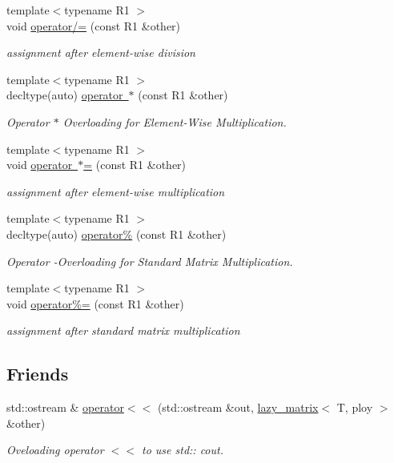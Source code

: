 \begin{DoxyCompactItemize}
{\footnotesize template$<$typename R1 $>$ }\\void \mbox{\hyperlink{classlazy__matrix_acffaec4e4abdb5984ac65aa0b8675e03}{operator/=}} (const R1 \&other)
\begin{DoxyCompactList}\small\item\em assignment after element-\/wise division \end{DoxyCompactList}\item 
{\footnotesize template$<$typename R1 $>$ }\\decltype(auto) \mbox{\hyperlink{classlazy__matrix_a11954c3e2e8af89ccd5f7ae15e12f40b}{operator $\ast$}} (const R1 \&other)
\begin{DoxyCompactList}\small\item\em Operator $\ast$ Overloading for Element-\/\+Wise Multiplication. \end{DoxyCompactList}\item 
{\footnotesize template$<$typename R1 $>$ }\\void \mbox{\hyperlink{classlazy__matrix_a130ec9cb8a9d894ab3f017533329ae00}{operator $\ast$=}} (const R1 \&other)
\begin{DoxyCompactList}\small\item\em assignment after element-\/wise multiplication \end{DoxyCompactList}\item 
{\footnotesize template$<$typename R1 $>$ }\\decltype(auto) \mbox{\hyperlink{classlazy__matrix_a42ed6693e9be89298335f160e0fad5b4}{operator\%}} (const R1 \&other)
\begin{DoxyCompactList}\small\item\em Operator -\/Overloading for Standard Matrix Multiplication. \end{DoxyCompactList}\item 
{\footnotesize template$<$typename R1 $>$ }\\void \mbox{\hyperlink{classlazy__matrix_a644e4a74c288602afd6cae4682949ab5}{operator\%=}} (const R1 \&other)
\begin{DoxyCompactList}\small\item\em assignment after standard matrix multiplication \end{DoxyCompactList}\end{DoxyCompactItemize}
\subsection*{Friends}
\begin{DoxyCompactItemize}
\item 
std\+::ostream \& \mbox{\hyperlink{classlazy__matrix_a88346f662d7a65addb3240c62dcdd1f9}{operator$<$$<$}} (std\+::ostream \&out, \mbox{\hyperlink{classlazy__matrix}{lazy\+\_\+matrix}}$<$ T, ploy $>$ \&other)
\begin{DoxyCompactList}\small\item\em Oveloading operator $<$$<$ to use std\+:\+: cout. \end{DoxyCompactList}\end{DoxyCompactItemize}


